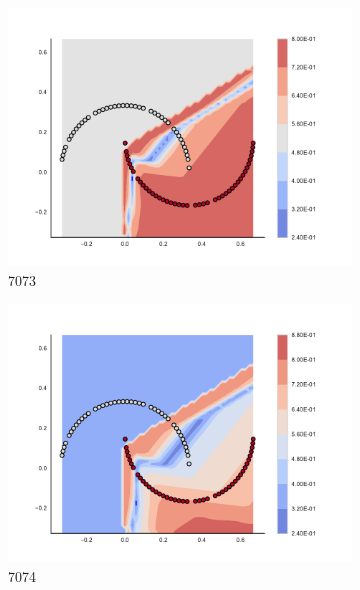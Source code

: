 \begin{figure}[h]
\begin{subfigure}[b]{0.09\textwidth}
    \includegraphics[clip, trim=2.35cm 1.75cm 4.5cm 0cm,width=\textwidth]{img/convergence/7073.pdf}
    \caption{7073}
    \label{fig:convergence_7073}
\end{subfigure}
%
\begin{subfigure}[b]{0.09\textwidth}
    \includegraphics[clip, trim=2.35cm 1.75cm 4.5cm 0cm,width=\textwidth]{img/convergence/7074.pdf}
    \caption{7074}
    \label{fig:convergence_7074}
\end{subfigure}
%
\begin{subfigure}[b]{0.09\textwidth}

\end{subfigure}
\end{figure}
